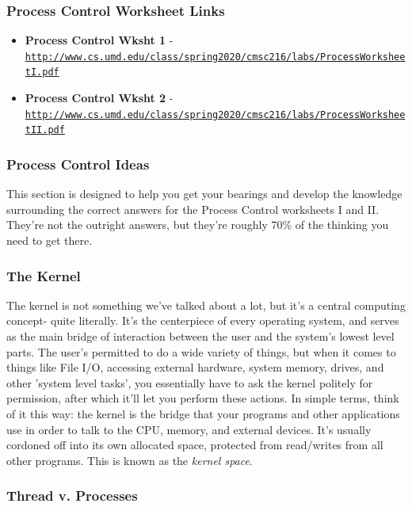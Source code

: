 \documentclass[english, 10pt]{article}
\begin{document}
\subsubsection{Process Control Worksheet Links}

\begin{itemize}
	\item \textbf{Process Control Wksht 1} - \texttt{\href{http://www.cs.umd.edu/class/spring2020/cmsc216/labs/ProcessWorksheetI.pdf}{http://www.cs.umd.edu/class/spring2020/cmsc216/labs/ProcessWorksheetI.pdf}}
	\item \textbf{Process Control Wksht 2} - \texttt{\href{http://www.cs.umd.edu/class/spring2020/cmsc216/labs/ProcessWorksheetII.pdf}{http://www.cs.umd.edu/class/spring2020/cmsc216/labs/ProcessWorksheetII.pdf}}
\end{itemize}

\subsubsection{Process Control Ideas}

This section is designed to help you get your bearings and develop the knowledge surrounding the correct answers for the Process Control worksheets I and II. They're not the outright answers, but they're roughly 70\% of the thinking you need to get there.

\subsubsection{The Kernel}

The kernel is not something we've talked about a lot, but it's a central computing concept- quite literally. It's the centerpiece of every operating system, and serves as the main bridge of interaction between the user and the system's lowest level parts. The user's permitted to do a wide variety of things, but when it comes to things like File I/O, accessing external hardware, system memory, drives, and other 'system level tasks', you essentially have to ask the kernel politely for permission, after which it'll let you perform these actions. In simple terms, think of it this way: the kernel is the bridge that your programs and other applications use in order to talk to the CPU, memory, and external devices. It's usually cordoned off into its own allocated space, protected from read/writes from all other programs. This is known as the \textit{kernel space}.

\subsubsection{Thread v. Processes}
\end{document}
